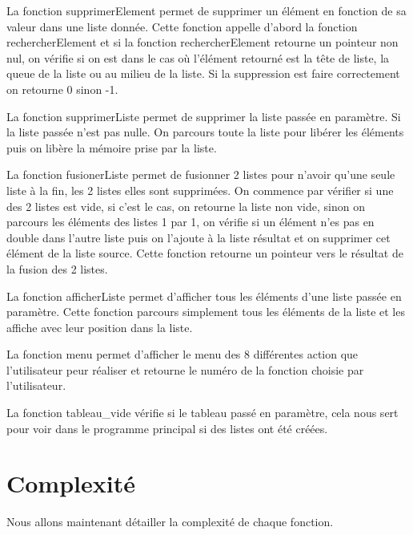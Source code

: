 \documentclass[11pt]{report}
\begin{document}
\medskip

La fonction supprimerElement permet de supprimer un élément en fonction de sa valeur dans une liste donnée. Cette fonction appelle d'abord la fonction rechercherElement et si la fonction rechercherElement retourne un pointeur non nul, on vérifie si on est dans le cas où l'élément retourné est la tête de liste, la queue de la liste ou au milieu de la liste.
Si la suppression est faire correctement on retourne 0 sinon -1.

\medskip

La fonction supprimerListe permet de supprimer la liste passée en paramètre. Si la liste passée n'est pas nulle. On parcours toute la liste pour libérer les éléments puis on libère la mémoire prise par la liste.

\medskip

La fonction fusionerListe permet de fusionner 2 listes pour n'avoir qu'une seule liste à la fin, les 2 listes elles sont supprimées. On commence par vérifier si une des 2 listes est vide, si c'est le cas, on retourne la liste non vide, sinon on parcours les éléments des listes 1 par 1, on vérifie si un élément n'es pas en double dans l'autre liste puis on l'ajoute à la liste résultat et on supprimer cet élément de la liste source. Cette fonction retourne un pointeur vers le résultat de la fusion des 2 listes.

\medskip

La fonction afficherListe permet d'afficher tous les éléments d'une liste passée en paramètre. Cette fonction parcours simplement tous les éléments de la liste et les affiche avec leur position dans la liste.

\medskip

La fonction menu permet d'afficher le menu des 8 différentes action que l'utilisateur peur réaliser et retourne le numéro de la fonction choisie par l'utilisateur.

\medskip

La fonction tableau\_vide vérifie si le tableau passé en paramètre, cela nous sert pour voir dans le programme principal si des listes ont été créées.

\section{Complexité}

Nous allons maintenant détailler la complexité de chaque fonction.

\medskip
\end{document}
